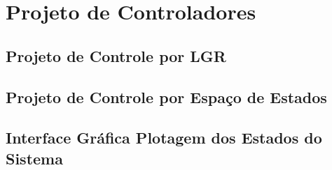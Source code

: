 \chapter{Projeto de Controladores}

\lipsum[1] %

\section{Projeto de Controle por LGR}


\section{Projeto de Controle por Espaço de Estados}


\section{Interface Gráfica Plotagem dos Estados do Sistema}
